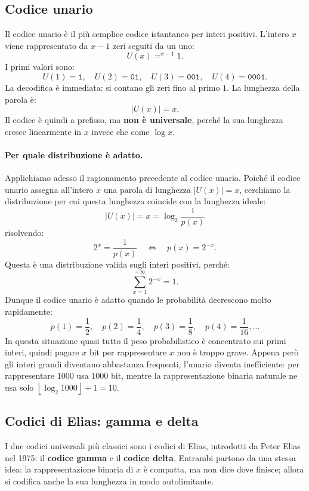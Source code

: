 \documentclass{article}
\theoremstyle{definition}
\numberwithin{equation}{section}
\begin{document}
\subsection{Codice unario}
Il codice unario è il più semplice codice istantaneo per interi positivi. L'intero $x$ viene rappresentato da $x-1$ zeri seguiti da un uno:
\begin{equation}\label{eq:unary_code}
    U(x)=^{x-1}1.
\end{equation}
I primi valori sono:
\[
    U(1)=\texttt{1},\quad
    U(2)=\texttt{01},\quad
    U(3)=\texttt{001},\quad
    U(4)=\texttt{0001}.
\]
La decodifica è immediata: si contano gli zeri fino al primo $1$. La lunghezza della parola è:
\[
    |U(x)|=x.
\]
Il codice è quindi a prefisso, ma \textbf{non è universale}, perché la sua lunghezza cresce linearmente in $x$ invece che come $\log x$.

\paragraph{Per quale distribuzione è adatto.}
Applichiamo adesso il ragionamento precedente al codice unario. Poiché il codice unario assegna all'intero $x$ una parola di lunghezza $|U(x)|=x$, cerchiamo la distribuzione per cui questa lunghezza coincide con la lunghezza ideale:
\[
    |U(x)|=x=\log_2\frac{1}{p(x)}
\]
risolvendo:
\[
    2^x=\frac{1}{p(x)}
    \quad\Longleftrightarrow\quad
    p(x)=2^{-x}.
\]
Questa è una distribuzione valida sugli interi positivi, perché:
\[
    \sum_{x=1}^{+\infty}2^{-x}=1.
\]
Dunque il codice unario è adatto quando le probabilità decrescono molto rapidamente:
\[
    p(1)=\frac{1}{2},
    \quad
    p(2)=\frac{1}{4},
    \quad
    p(3)=\frac{1}{8},
    \quad
    p(4)=\frac{1}{16},
    \ldots
\]
In questa situazione quasi tutto il peso probabilistico è concentrato sui primi interi, quindi pagare $x$ bit per rappresentare $x$ non è troppo grave. Appena però gli interi grandi diventano abbastanza frequenti, l'unario diventa inefficiente: per rappresentare $1000$ usa $1000$ bit, mentre la rappresentazione binaria naturale ne usa solo $\left\lfloor\log_2 1000\right\rfloor+1=10$.

\subsection{Codici di Elias: gamma e delta}
I due codici universali più classici sono i codici di Elias, introdotti da Peter Elias nel 1975: il \textbf{codice gamma} e il \textbf{codice delta}. Entrambi partono da una stessa idea: la rappresentazione binaria di $x$ è compatta, ma non dice dove finisce; allora si codifica anche la sua lunghezza in modo autolimitante.
\end{document}
